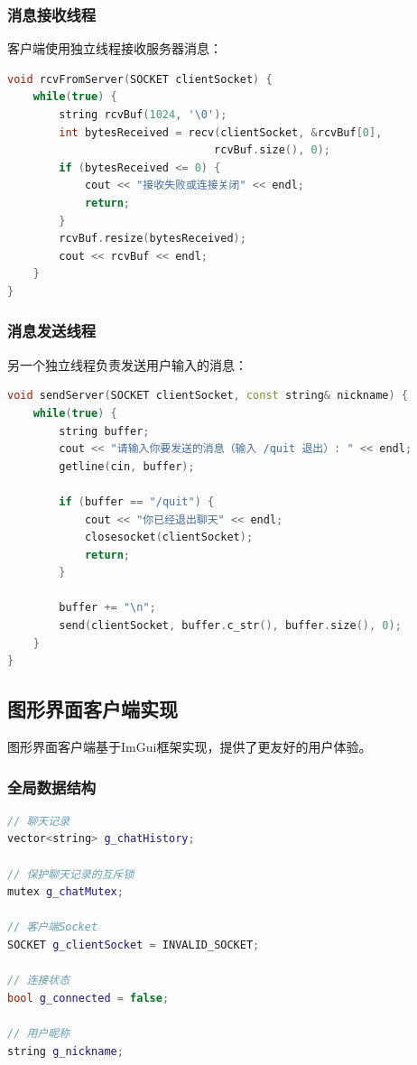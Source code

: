 \documentclass[12pt, a4paper]{article}
\begin{document}
\subsubsection{消息接收线程}

客户端使用独立线程接收服务器消息：

\begin{lstlisting}[language=c++]
void rcvFromServer(SOCKET clientSocket) {
    while(true) {
        string rcvBuf(1024, '\0');
        int bytesReceived = recv(clientSocket, &rcvBuf[0], 
                                rcvBuf.size(), 0);
        if (bytesReceived <= 0) {
            cout << "接收失败或连接关闭" << endl;
            return;
        }
        rcvBuf.resize(bytesReceived);
        cout << rcvBuf << endl;
    }
}
\end{lstlisting}

\subsubsection{消息发送线程}

另一个独立线程负责发送用户输入的消息：

\begin{lstlisting}[language=c++]
void sendServer(SOCKET clientSocket, const string& nickname) {
    while(true) {
        string buffer;
        cout << "请输入你要发送的消息（输入 /quit 退出）: " << endl;
        getline(cin, buffer);
        
        if (buffer == "/quit") {
            cout << "你已经退出聊天" << endl;
            closesocket(clientSocket);
            return;
        }
        
        buffer += "\n";
        send(clientSocket, buffer.c_str(), buffer.size(), 0);
    }
}
\end{lstlisting}

\subsection{图形界面客户端实现}

图形界面客户端基于ImGui框架实现，提供了更友好的用户体验。

\subsubsection{全局数据结构}

\begin{lstlisting}[language=c++]
// 聊天记录
vector<string> g_chatHistory;

// 保护聊天记录的互斥锁
mutex g_chatMutex;

// 客户端Socket
SOCKET g_clientSocket = INVALID_SOCKET;

// 连接状态
bool g_connected = false;

// 用户昵称
string g_nickname;
\end{lstlisting}
\end{document}
